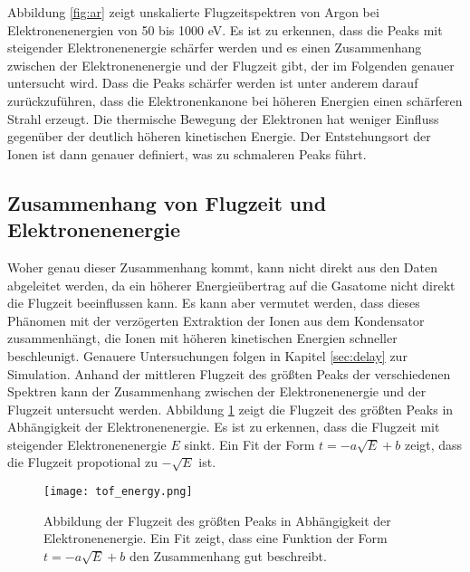 Abbildung \ref{fig:ar} zeigt unskalierte Flugzeitspektren von Argon bei Elektronenenergien von 50 bis 1000 eV. Es ist zu erkennen, dass die Peaks mit steigender Elektronenenergie schärfer werden und es einen Zusammenhang zwischen der Elektronenenergie und der Flugzeit gibt, der im Folgenden genauer untersucht wird. Dass die Peaks schärfer werden ist unter anderem darauf zurückzuführen, dass die Elektronenkanone bei höheren Energien einen schärferen Strahl erzeugt. Die thermische Bewegung der Elektronen hat weniger Einfluss gegenüber der deutlich höheren kinetischen Energie. Der Entstehungsort der Ionen ist dann genauer definiert, was zu schmaleren Peaks führt.

\subsection{Zusammenhang von Flugzeit und Elektronenenergie}
Woher genau dieser Zusammenhang kommt, kann nicht direkt aus den Daten abgeleitet werden, da ein höherer Energieübertrag auf die Gasatome nicht direkt die Flugzeit beeinflussen kann. Es kann aber vermutet werden, dass dieses Phänomen mit der verzögerten Extraktion der Ionen aus dem Kondensator zusammenhängt, die Ionen mit höheren kinetischen Energien schneller beschleunigt. Genauere Untersuchungen folgen in Kapitel \ref{sec:delay} zur Simulation. Anhand der mittleren Flugzeit des größten Peaks der verschiedenen Spektren kann der Zusammenhang zwischen der Elektronenenergie und der Flugzeit untersucht werden.
Abbildung \ref{fig:tof_energy} zeigt die Flugzeit des größten Peaks in Abhängigkeit der Elektronenenergie. Es ist zu erkennen, dass die Flugzeit mit steigender Elektronenenergie $E$ sinkt. Ein Fit der Form $t = -a\sqrt{E} + b$ zeigt, dass die Flugzeit propotional zu $-\sqrt{E}$ ist.

\begin{figure}
    \centering
    \texttt{[image: tof\_energy.png]}
    \caption[Zusammenhang zwischen TOF und Elektronenenergie]{Abbildung der Flugzeit des größten Peaks in Abhängigkeit der Elektronenenergie. Ein Fit zeigt, dass eine Funktion der Form $t = -a\sqrt{E} + b$ den Zusammenhang gut beschreibt.}
    \label{fig:tof_energy}
\end{figure}


